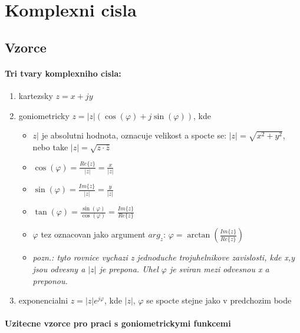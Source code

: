 \chapter{Komplexni cisla}

\section*{Vzorce}

\subsubsection*{Tri tvary komplexniho cisla:}
\begin{enumerate}
  \item kartezsky $z=x+jy$
  \item goniometricky $z=|z|(\operatorname{cos}(\varphi)+j\operatorname{sin}(\varphi))$, kde 
  \begin{itemize}
    \item $z|$ je absolutni hodnota, oznacuje velikost a spocte se: $|z|=\sqrt{x^2+y^2}$, nebo take $|z|=\sqrt{z\cdot \bar{z}}$
    \item $\operatorname{cos}(\varphi)=\frac{Re\{z\}}{|z|} = \frac{x}{|z|}$
    \item $\operatorname{sin}(\varphi) = \frac{Im\{z\}}{|z|} = \frac{y}{|z|}$
    \item $\operatorname{tan}(\varphi) = \frac{\operatorname{sin}(\varphi)}{\operatorname{cos}(\varphi)}=\frac{Im\{z\}}{Re\{z\}}$
    \item $\varphi$ tez oznacovan jako argument $arg_z$: $\varphi = \operatorname{arctan}\left( \frac{Im\{z\}}{Re\{z\}}\right)$
    \item \textit{pozn.: tyto rovnice vychazi z jednoduche trojuhelnikove zavislosti, kde x,y jsou odvesny a $|z|$ je prepona. Uhel $\varphi$ je sviran mezi odvesnou x a preponou.}
  \end{itemize}
  \item exponencialni $z=|z|e^{j\varphi}$, kde $|z|$, $\varphi$ se spocte stejne jako v predchozim bode
\end{enumerate}

\subsubsection*{\label{sec:go_vz}Uzitecne vzorce pro praci s  goniometrickymi funkcemi}

